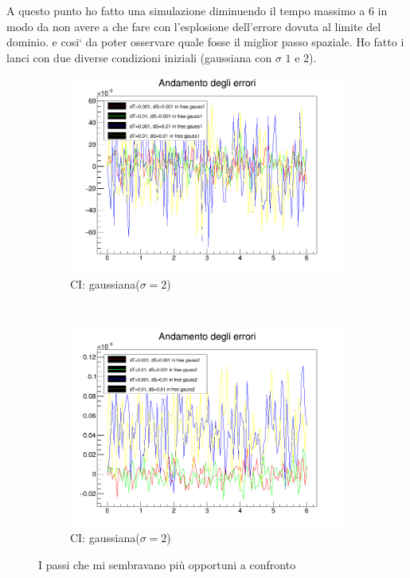 A questo punto ho fatto una simulazione diminuendo il tempo massimo a $6$ in modo da non avere a che fare con l'esplosione dell'errore dovuta al limite del dominio. e cosi` da poter osservare quale fosse il miglior passo spaziale. Ho fatto i lanci con due diverse condizioni iniziali (gaussiana con $\sigma$ $1$ e $2$). 

\begin{figure}[htb]
  \centering
  \begin{subfigure}[b]{0.45\textwidth}
    \includegraphics[width=\textwidth]{IMG/eChoosy1}
    \caption{CI: gaussiana($\sigma=2$)}
  \end{subfigure}
  ~
  \begin{subfigure}[b]{0.45\textwidth}
    \includegraphics[width=\textwidth]{IMG/eChoosy2}
    \caption{CI: gaussiana($\sigma=2$)}
  \end{subfigure}
  \caption{I passi che mi sembravano pi\`u opportuni a confronto}\label{fig:SceltaErrori}
\end{figure}

